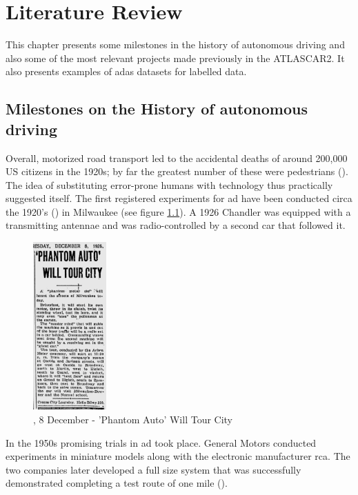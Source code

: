 \chapter{Literature Review}

This chapter presents some milestones in the history of autonomous driving and also some of the most relevant projects made previously in the ATLASCAR2. It also presents examples of \gls{adas} datasets for labelled data.


\section{Milestones on the History of autonomous driving}

Overall, motorized road transport led to the accidental deaths of around 200,000 US citizens in the 1920s; by far the greatest number of these were pedestrians (\cite{Kroger2016}). The idea of substituting error-prone humans with technology thus practically suggested itself. The first registered experiments for \gls{ad} have been conducted circa the 1920's (\cite{TheMilwaukeeSentinel}) in Milwaukee (see figure \ref{fig:phantomauto}). A 1926 Chandler was equipped with a transmitting antennae and was radio-controlled by a second car that followed it.

\begin{figure}[htp]
	
	\centering
	\includegraphics[width=0.25\textwidth]{capstate/imgs/jornal.png}
	
	\caption{\cite{TheMilwaukeeSentinel}, 8 December - 'Phantom Auto' Will Tour City}
	\label{fig:phantomauto}
	
\end{figure}

In the 1950s promising trials in \gls{ad} took place. General Motors conducted experiments in miniature models along with the electronic manufacturer \gls{rca}. The two companies later developed a full size system that was successfully demonstrated completing a test route of one mile (\cite{Kroger2016}).

